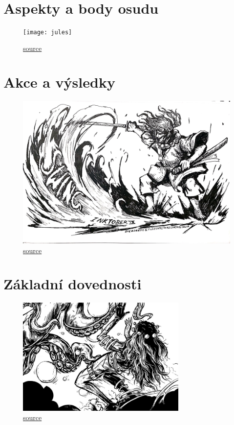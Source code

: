 \documentclass[12pt,a4paper,twoside,openany]{book}
\begin{document}
\chapter{Aspekty a body osudu}
\label{chap:aspekty}


\begin{figure}[h!]
  \centering
  \caption{\href{https://aukceaukci.s3.amazonaws.com/aukceaukci/production/files/2024/02/06/10/15/12/906b839a-538e-4f31-bbcc-131d423cb646/1.webp}{source}}
  \texttt{[image: jules]}
\end{figure}

\chapter{Akce a výsledky}
\label{chap:akce}


\begin{figure}[h!]
  \centering
  \caption{\href{https://pbs.twimg.com/media/EGcmJ2vU0AIqTU9?format=jpg&name=large}{source}}
  \includegraphics[width=\textwidth]{swing}
\end{figure}

\chapter{Základní dovednosti}
\label{chap:dovednosti}


\begin{figure}[h!]
  \centering
  \caption{\href{https://www.humanart.cz/user/2527/art/st/2527-1324900216-2.jpg}{source}}
  \includegraphics[width=0.75\textwidth]{chobotnice}
\end{figure}
\end{document}
